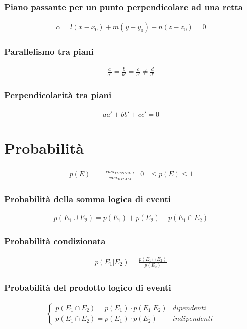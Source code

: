 \documentclass[a4paper]{article}
\begin{document}
	\subsubsection*{Piano passante per un punto perpendicolare ad una retta}
	
	\begin{align*}
		\alpha = l(x-x_0)+m(y-y_0)+n(z-z_0)=0
	\end{align*}
	
	\subsubsection*{Parallelismo tra piani}
	\begin{align*}
		\frac{a}{a'} = \frac{b}{b'} = \frac{c}{c'} \ne \frac{d}{d'}
	\end{align*}
	
	\subsubsection*{Perpendicolarità tra piani}
	\begin{align*}
		aa'+bb'+cc'=0
	\end{align*}
	
	\newpage
	\section{Probabilità}
	\begin{align*}
		p(E) & = \frac{casi_{POSSIBILI}}{casi_{TOTALI}} & 0 & \le p(E) \le 1
	\end{align*}
	
	\subsubsection*{Probabilità della somma logica di eventi}
	\begin{align*}
		p(E_1 \cup E_2) = p(E_1) + p(E_2) - p(E_1 \cap E_2)
	\end{align*}
	
	\subsubsection*{Probabilità condizionata}
	\begin{align*}
		p(E_1 | E_2) = \frac{p(E_1 \cap E_2)}{p(E_2)}
	\end{align*}
	
	\subsubsection*{Probabilità del prodotto logico di eventi}
	\begin{align*}
		\begin{cases}
		p(E_1 \cap E_2) = p(E_1) \cdot p(E_1 | E_2)	& dipendenti\\
		p(E_1 \cap E_2) = p(E_1) \cdot p(E_2)		& indipendenti
		\end{cases}
	\end{align*}
	
\end{document}

